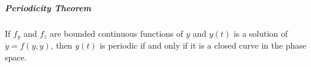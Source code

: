 \documentclass[11pt]{article}
\begin{document}
	\subparagraph{Periodicity Theorem} If $f_y$ and $f_z$ are bounded continuous functions of $y$ and $y(t)$ is a solution of $\dot{y} = f(y, \dot{y})$, then $y(t)$ is periodic if and only if it is a closed curve in the phase space.

%		
%		


\end{document}
